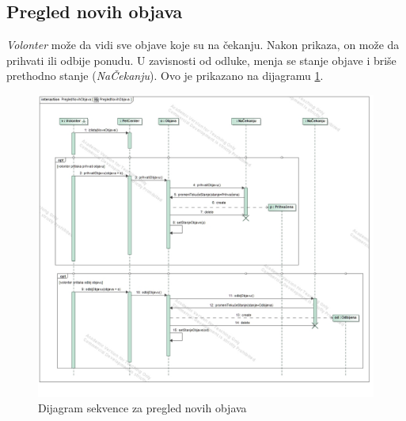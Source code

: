 \subsection{Pregled novih objava}
\par \textit{Volonter} može da vidi sve objave koje su na čekanju. Nakon prikaza, on može da prihvati ili odbije ponudu. U zavisnosti od odluke, menja se
stanje objave i briše prethodno stanje (\textit{NaČekanju}). Ovo je prikazano na dijagramu \ref{fig:posts-list-seq}.
\begin{figure}[h]
    \centering
    \includegraphics[width=\textwidth, height=\textwidth]{img/new_posts-sequence.jpg}
    \caption{Dijagram sekvence za pregled novih objava}
    \label{fig:posts-list-seq}
\end{figure}
